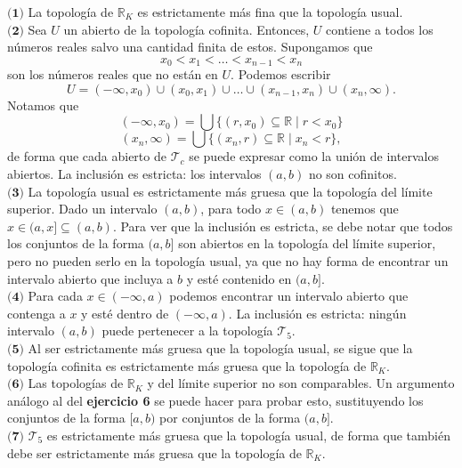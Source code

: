 \documentclass{article}
\begin{document}
$\textbf{(1)}$ La topología de $\mathbb{R}_{K}$ es estrictamente más fina que la topología usual. \\

$\textbf{(2)}$ Sea $U$ un abierto de la topología cofinita. Entonces, $U$ contiene a todos los números reales salvo una cantidad finita de estos.  Supongamos que 
$$ x_{0} < x_{1} < \ldots < x_{n-1} < x_{n} $$
son los números reales que no están en $U$. Podemos escribir
$$ U = (-\infty, x_{0}) \cup (x_{0}, x_{1}) \cup \ldots \cup (x_{n-1}, x_{n}) \cup (x_{n}, \infty). $$
Notamos que 
$$ (-\infty, x_{0}) = \bigcup \{ (r, x_{0}) \subseteq \mathbb{R} \mid r < x_{0} \} $$
$$(x_{n},\infty) = \bigcup \{ (x_{n}, r) \subseteq \mathbb{R} \mid x_{n} < r  \}, $$
de forma que cada abierto de $\mathcal{T}_{c}$ se puede expresar como la unión de intervalos abiertos. La inclusión es estricta: los intervalos $(a, b)$ no son cofinitos. \\

$\textbf{(3)}$ La topología usual es estrictamente más gruesa que la topología del límite superior. Dado un intervalo $(a, b)$, para todo $x \in (a, b)$ tenemos que $x \in (a, x] \subseteq (a, b)$. Para ver que la inclusión es estricta, se debe notar que todos los conjuntos de la forma $(a, b]$ son abiertos en la topología del límite superior, pero no pueden serlo en la topología usual, ya que no hay forma de encontrar un intervalo abierto que incluya a $b$ y esté contenido en $(a, b]$. \\

$\textbf{(4)}$ Para cada $x \in (-\infty, a)$ podemos encontrar un intervalo abierto que contenga a $x$ y esté dentro de $(-\infty, a)$. La inclusión es estricta: ningún intervalo $(a, b)$ puede pertenecer a la topología $\mathcal{T}_{5}$. \\

$\textbf{(5)}$ Al ser estrictamente más gruesa que la topología usual, se sigue que la topología cofinita es estrictamente más gruesa que la topología de $\mathbb{R}_{K}$.\\

$\textbf{(6)}$ Las topologías de $\mathbb{R}_{K}$ y del límite superior no son comparables. Un argumento análogo al del \textbf{ejercicio 6} se puede hacer para probar esto, sustituyendo los conjuntos de la forma $[a,b)$ por conjuntos de la forma $(a,b]$. \\

$\textbf{(7)}$ $\mathcal{T}_{5}$ es estrictamente más gruesa que la topología usual, de forma que también debe ser estrictamente más gruesa que la topología de $\mathbb{R}_{K}$. \\
\end{document}
